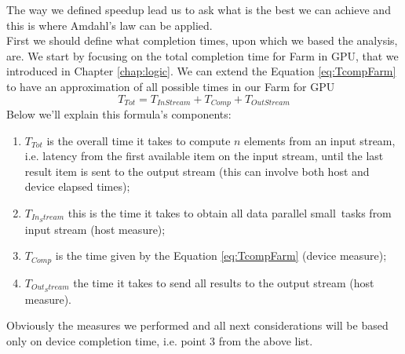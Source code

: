 The way we defined speedup lead us to ask what is the best we can achieve and this is where Amdahl's law can be applied.\\
First we should define what completion times, upon which we based the analysis, are. 
We start by focusing on the total completion time for Farm in GPU, that we introduced in Chapter \ref{chap:logic}.
We can extend the Equation \ref{eq:TcompFarm} to have an approximation of all possible times in our Farm for GPU
\begin{equation}\label{eq:totTime}
	T_{Tot} = T_{In Stream} + T_{Comp} + T_{Out Stream}
\end{equation}
Below we'll explain this formula's components:
\begin{enumerate}
	
	\item \(T_{Tot}\) is the overall time it takes to compute \(n\) elements from an input stream, i.e. latency from the first available item on the input stream, until the last result item is sent to the output stream (this can involve both host and device elapsed times);
	
	\item \(T_{In_Stream}\) this is the time it takes to obtain all \textendash data parallel small\textendash \ tasks from input stream (host measure);
	
	\item \(T_{Comp}\) is the time given by the Equation \ref{eq:TcompFarm} (device measure);
	
	
	
	\item \(T_{Out_Stream}\) the time it takes to send all results to the output stream (host measure).	
\end{enumerate}
Obviously the measures we performed and all next considerations will be based only on device completion time, i.e. point 3 from the above list.\\
